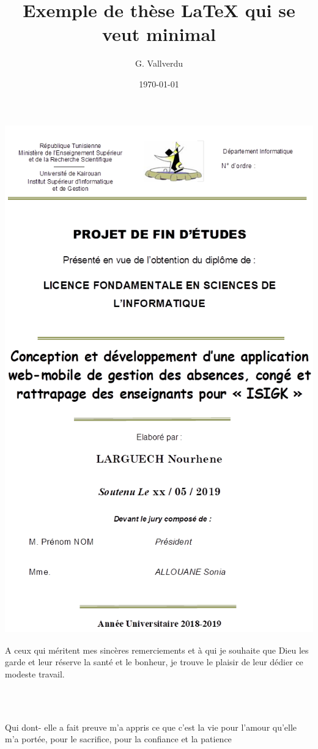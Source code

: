 \documentclass[12 pt ]{report}
\title{Exemple de thèse \LaTeX{} qui se veut minimal}
\author{G. Vallverdu}
\date{\today}
\begin{document}
\includegraphics[width=16cm,height=22cm]{pdg.png}
\thispagestyle{empty}
\newpage
\thispagestyle{empty}
\begin{center}


\Huge\textbf{\selectfont {Dédicace}}
\end{center}


 A ceux qui méritent mes sincères remerciements et à qui je souhaite que Dieu les garde et leur réserve la santé et le bonheur, je trouve le plaisir de leur dédier ce modeste travail.
\\
\\
\begin{center}
\Large{}\selectfont {A}\\
\Large\textbf{\selectfont {Ma famille}}
\end{center}
 Qui dont- elle a fait preuve m’a appris ce que c’est la vie pour l’amour qu’elle m'a portée, pour le sacrifice, pour la confiance et la patience 
\end{document}
